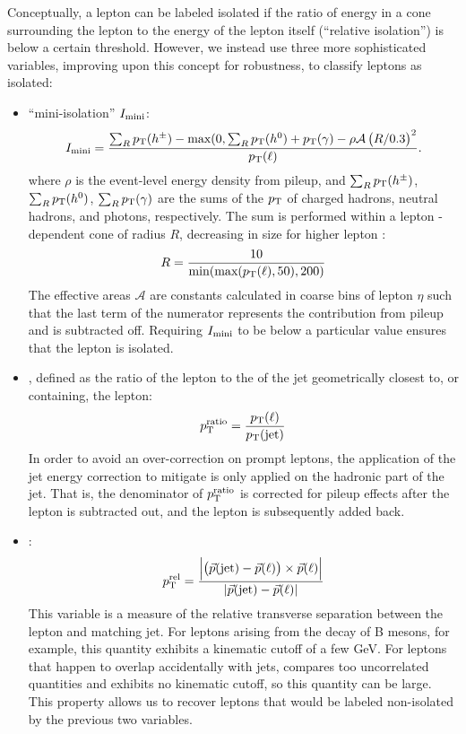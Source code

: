 Conceptually, a lepton can be labeled isolated if the ratio of 
energy in a cone surrounding the lepton to the energy of the lepton itself
(``relative isolation'') is below a certain threshold.
However, we instead use three more sophisticated variables, improving upon this concept for robustness,
to classify leptons as isolated:
\begin{itemize}
    \item ``mini-isolation'' $I_\mathrm{mini}$: 
    \begin{equation}
        I_\mathrm{mini} = \frac{\sum_R p_{\mathrm{T}}(h^\pm) - \mbox{max}(0, \sum_R p_{\mathrm{T}}(h^0)+p_{\mathrm{T}}(\gamma) - \rho\mathcal{A}\left(R/0.3\right)^2}{p_{\mathrm{T}}(\ell)}.
    \end{equation}
    where $\rho$ is the event-level energy density from pileup,
    and $\sum_Rp_{\mathrm{T}}(h^\pm)$, $\sum_Rp_{\mathrm{T}}(h^0)$, $\sum_Rp_{\mathrm{T}}(\gamma)$ 
    are the sums of the $p_{\mathrm{T}}$ of charged hadrons, neutral hadrons, and photons, respectively.
    The sum is performed within a lepton \pt-dependent cone of radius $R$, decreasing in size
    for higher lepton \pt:
    \begin{equation}
        R = \frac{10}{\mbox{min}(\mbox{max}(p_{\mathrm{T}}(\ell), 50), 200)}
    \end{equation}
    The effective areas $\mathcal{A}$ are constants calculated in coarse bins of
    lepton $\eta$ such that the last term of the numerator represents the
    contribution from pileup and is subtracted off.
    Requiring $I_\mathrm{mini}$ to be below a particular value ensures that the
    lepton is isolated.

    \item \ptratio, defined as the ratio of the lepton \pt to the
    \pt of the jet geometrically closest to, or containing, the lepton:
    \begin{equation}
        p_{\mathrm{T}}^\text{ratio} = \frac{p_{\mathrm{T}}(\ell)}{p_{\mathrm{T}}(\text{jet})}
    \end{equation}
    In order to avoid an
    over-correction on prompt leptons, the application of the jet energy
    correction to mitigate is only applied on the hadronic part of the jet.
    That is, the denominator of $p_{\mathrm{T}}^\text{ratio}$ is corrected for pileup effects
    after the lepton is subtracted out, and the lepton is subsequently added back.

    \item \ptrel:
    \begin{equation}
        p_{\mathrm{T}}^\text{rel}=\frac{\left|\left(\vec{p}(\text{jet})-\vec{p}(\ell)\right) 
        \times \vec{p}(\ell)\right| }{|\vec{p}(\text{jet})-\vec{p}(\ell)|}
    \end{equation}
    This variable is a measure of the relative transverse separation between the lepton 
    and matching jet. For leptons arising from the decay of B mesons, for example,
    this quantity exhibits a kinematic cutoff of a few GeV. For leptons that
    happen to overlap accidentally with jets, \ptrel compares too uncorrelated
    quantities and exhibits no kinematic cutoff, so this quantity can be large.
    This property allows us to recover leptons that would be labeled non-isolated
    by the previous two variables.
\end{itemize}

